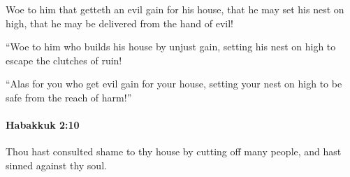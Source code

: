 			\begin{versebox}
					\item[BHS] 
					\item[LXX] 
					\item[ASV] Woe to him that getteth an evil gain for his house, that he may set his nest on high, that he may be delivered from the hand of evil!
					\item[NIV] “Woe to him who builds his house by unjust gain, setting his nest on high to escape the clutches of ruin!
					\item[NRSV] “Alas for you who get evil gain for your house, setting your nest on high to be safe from the reach of harm!”
			\end{versebox}

		\paragraph{Habakkuk 2:10} %
			\label{HABAKKUK-2-10}

			Thou hast consulted shame to thy house by cutting off many people, and hast sinned against thy soul.

